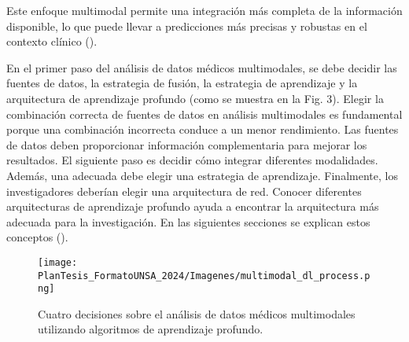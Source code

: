Este enfoque multimodal permite una integración más completa de la información disponible, lo que puede llevar a predicciones más precisas y robustas en el contexto clínico (\cite{BEHRAD2022117006}).
\newline

En el primer paso del análisis de datos médicos multimodales, se debe decidir las fuentes de datos, la estrategia de fusión, la estrategia de aprendizaje y la arquitectura de aprendizaje profundo (como se muestra en la Fig. 3). Elegir la combinación correcta de fuentes de datos en análisis multimodales es fundamental porque una combinación incorrecta conduce a un menor rendimiento. Las fuentes de datos deben proporcionar información complementaria para mejorar los resultados. El siguiente paso es decidir cómo integrar diferentes modalidades. Además, una adecuada debe elegir una estrategia de aprendizaje. Finalmente, los investigadores deberían elegir una arquitectura de red. Conocer diferentes arquitecturas de aprendizaje profundo ayuda a encontrar la arquitectura más adecuada para la investigación. En las siguientes secciones se explican estos conceptos (\cite{BEHRAD2022117006}).
\begin{figure}[!h]
	\centering
	\texttt{[image: PlanTesis\_FormatoUNSA\_2024/Imagenes/multimodal\_dl\_process.png]}
    \caption{Cuatro decisiones sobre el análisis de datos médicos multimodales utilizando algoritmos de aprendizaje profundo.}
    \label{fig:estructura_cerebro}
\end{figure}

